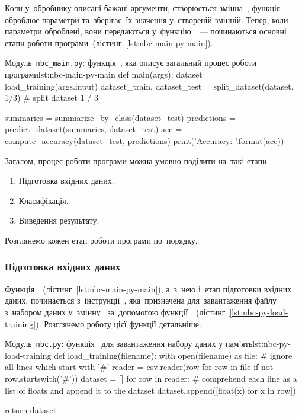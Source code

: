 \documentclass[
	a4paper,
	oneside,
	DIV = 12,
	fontsize = 13pt,
	headings = normal,
	numbers = endperiod,
	bibliography = totoc, %
]{scrartcl}
\theoremstyle{mythm}
\newcommand{\filename}[1]{\texttt{#1}}
\begin{document}
			Коли у~обробнику описані бажані аргументи, створюється змінна~, функція~ оброблює параметри та~зберігає~їх значення у~створеній змінній. Тепер, коли параметри оброблені, вони передаються у~функцію~~— починаються основні етапи роботи програми~(лістинг~\ref{lst:nbc-main-py-main}).

			\begin{listingpython}{Модуль~\filename{nbc\_main.py}: функція~, яка описує загальний процес роботи програми}{lst:nbc-main-py-main}
def main(args):
	dataset = load_training(args.input)
	dataset_train, dataset_test = split_dataset(dataset, 1/3) # split dataset 1 / 3

	summaries = summarize_by_class(dataset_test)
	predictions = predict_dataset(summaries, dataset_test)
	acc = compute_accuracy(dataset_test, predictions)
	print('Accuracy: {}'.format(acc))
				\end{listingpython}
			
				Загалом, процес роботи програми можна умовно поділити на~такі етапи:
				\begin{enumerate}
					\item Підготовка вхідних даних.
					\item Класифікація.
					\item Виведення результату.
				\end{enumerate}

				Розглянемо кожен етап роботи програми по~порядку.

				\subsubsection{Підготовка вхідних даних}

					Функція~~(лістинг~\ref{lst:nbc-main-py-main}), а~з~нею і~етап підготовки вхідних даних, починається з~інструкції~, яка~призначена для~завантаження файлу з~набором даних у~змінну~ за~допомогою функції~~(лістинг~\ref{lst:nbc-py-load-training}). Розглянемо роботу цієї функції детальніше.

					\begin{listingpython}{Модуль~\filename{nbc.py}: функція~ для завантаження набору даних у пам'ять}{lst:nbc-py-load-training}
	def load_training(filename):
			with open(filename) as file:
					# ignore all lines which start with '#'
					reader = csv.reader(row for row in file if not row.startswith('#'))
					dataset = []
					for row in reader:
							# comprehend each line as a list of floats and append it to the dataset
							dataset.append([float(x) for x in row])

			return dataset
					\end{listingpython}
\end{document}
